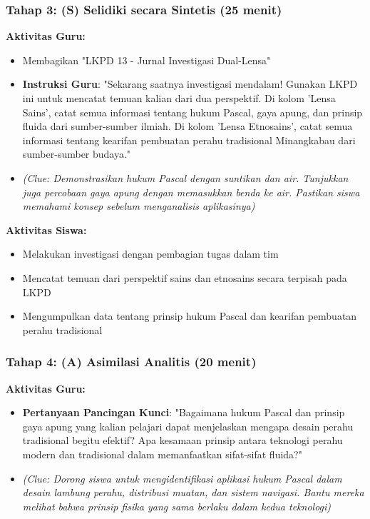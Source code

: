 \documentclass[12pt,a4paper]{article}
\begin{document}
\subsubsection{Tahap 3: (S) Selidiki secara Sintetis (25 menit)}

\textbf{Aktivitas Guru:}
\begin{itemize}
\item Membagikan "LKPD 13 - Jurnal Investigasi Dual-Lensa"
\item \textbf{Instruksi Guru}: "Sekarang saatnya investigasi mendalam! Gunakan LKPD ini untuk mencatat temuan kalian dari dua perspektif. Di kolom 'Lensa Sains', catat semua informasi tentang hukum Pascal, gaya apung, dan prinsip fluida dari sumber-sumber ilmiah. Di kolom 'Lensa Etnosains', catat semua informasi tentang kearifan pembuatan perahu tradisional Minangkabau dari sumber-sumber budaya."
\item \textit{(Clue: Demonstrasikan hukum Pascal dengan suntikan dan air. Tunjukkan juga percobaan gaya apung dengan memasukkan benda ke air. Pastikan siswa memahami konsep sebelum menganalisis aplikasinya)}
\end{itemize}

\textbf{Aktivitas Siswa:}
\begin{itemize}
\item Melakukan investigasi dengan pembagian tugas dalam tim
\item Mencatat temuan dari perspektif sains dan etnosains secara terpisah pada LKPD
\item Mengumpulkan data tentang prinsip hukum Pascal dan kearifan pembuatan perahu tradisional
\end{itemize}

\subsubsection{Tahap 4: (A) Asimilasi Analitis (20 menit)}

\textbf{Aktivitas Guru:}
\begin{itemize}
\item \textbf{Pertanyaan Pancingan Kunci}: "Bagaimana hukum Pascal dan prinsip gaya apung yang kalian pelajari dapat menjelaskan mengapa desain perahu tradisional begitu efektif? Apa kesamaan prinsip antara teknologi perahu modern dan tradisional dalam memanfaatkan sifat-sifat fluida?"
\item \textit{(Clue: Dorong siswa untuk mengidentifikasi aplikasi hukum Pascal dalam desain lambung perahu, distribusi muatan, dan sistem navigasi. Bantu mereka melihat bahwa prinsip fisika yang sama berlaku dalam kedua teknologi)}
\end{itemize}
\end{document}
